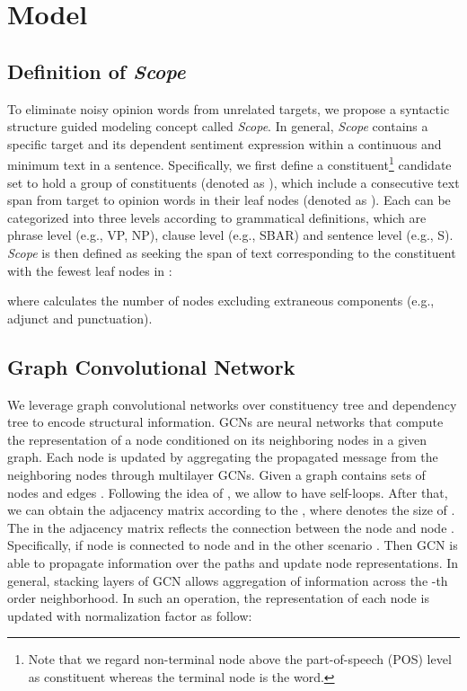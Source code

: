 \documentclass{article}
\begin{document}
\section{Model}
\subsection{Definition of \emph{Scope}}
To eliminate noisy opinion words from unrelated targets, we propose a syntactic structure guided modeling concept called \emph{Scope}. In general, \emph{Scope} contains a specific target and its dependent sentiment expression within a continuous and minimum text in a sentence. Specifically, we first define a constituent\footnote{Note that we regard non-terminal node above the part-of-speech (POS) level as constituent whereas the terminal node is the word.} candidate set  to hold a group of constituents (denoted as ), which include a consecutive text span from target to opinion words in their leaf nodes (denoted as ).  Each  can be categorized into three levels according to grammatical definitions, which are phrase level (e.g., VP, NP), clause level (e.g., SBAR) and sentence level (e.g., S). \emph{Scope} is then defined as seeking the span of text corresponding to the constituent with the fewest leaf nodes in :

where  calculates the number of nodes excluding extraneous components (e.g., adjunct and punctuation). 


\subsection{Graph Convolutional Network}

We leverage graph convolutional networks over constituency tree and dependency tree to encode structural information. GCNs are neural networks that compute the representation of a node conditioned on its neighboring nodes in a given graph. Each node is updated by aggregating the propagated message from the neighboring nodes through multilayer GCNs. Given a graph  contains sets of nodes  and edges . Following the idea of \cite{kipf2016semi}, we allow  to have self-loops. After that, we can obtain the adjacency matrix  according to the , where  denotes the size of . The  in the adjacency matrix reflects the connection between the node  and node . Specifically,  if node  is connected to node  and in the other scenario . Then GCN is able to propagate information over the paths and update node representations. In general, stacking  layers of GCN allows aggregation of information across the -th order neighborhood. In such an operation, the representation of each node is updated with normalization factor as follow:
\end{document}
